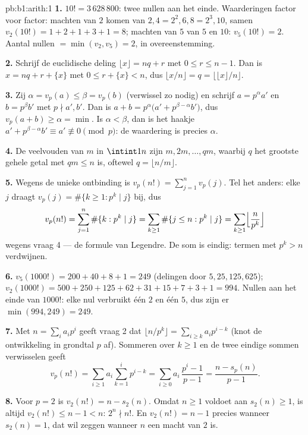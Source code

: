 \begin{solution}{pb:b1:arith:1}
\textbf{1.} $10! = 3\,628\,800$: twee nullen aan het einde. Waarderingen
factor voor factor: machten van $2$ komen van $2, 4 = 2^2, 6, 8 = 2^3,
10$, samen $v_2(10!) = 1 + 2 + 1 + 3 + 1 = 8$; machten van $5$ van $5$ en
$10$: $v_5(10!) = 2$. Aantal nullen $= \min(v_2, v_5) = 2$, in
overeenstemming.

\textbf{2.} Schrijf de euclidische deling $\lfloor x\rfloor = nq + r$ met
$0 \leq r \leq n - 1$. Dan is $x = nq + r + \{x\}$ met $0 \leq r + \{x\}
< n$, dus $\lfloor x/n \rfloor = q = \bigl\lfloor \lfloor x \rfloor / n
\bigr\rfloor$.

\textbf{3.} Zij $\alpha = v_p(a) \leq \beta = v_p(b)$ (verwissel zo
nodig) en schrijf $a = p^\alpha a'$ en $b = p^\beta b'$ met $p \nmid a',
b'$. Dan is $a + b = p^\alpha\bigl(a' + p^{\beta - \alpha}b'\bigr)$, dus
$v_p(a + b) \geq \alpha = \min$. Is $\alpha < \beta$, dan is het haakje
$a' + p^{\beta-\alpha}b' \equiv a' \not\equiv 0 \pmod p$: de waardering is
precies $\alpha$.

\textbf{4.} De veelvouden van $m$ in $\intint1n$ zijn $m, 2m, \dots, qm$,
waarbij $q$ het grootste gehele getal met $qm \leq n$ is, oftewel $q =
\lfloor n/m \rfloor$.

\textbf{5.} Wegens de unieke ontbinding is $v_p(n!) = \sum_{j=1}^{n}
v_p(j)$. Tel het anders: elke $j$ draagt $v_p(j) = \#\{k \geq 1 : p^k
\mid j\}$ bij, dus
\[
v_p(n!) = \sum_{j=1}^n \#\{k : p^k \mid j\}
= \sum_{k\geq1} \#\{j \leq n : p^k \mid j\}
= \sum_{k\geq1} \Bigl\lfloor \frac n{p^k} \Bigr\rfloor
\]
wegens vraag 4 --- de formule van Legendre. De som is eindig: termen met
$p^k > n$ verdwijnen.

\textbf{6.} $v_5(1000!) = 200 + 40 + 8 + 1 = 249$ (delingen door $5, 25,
125, 625$); $v_2(1000!) = 500 + 250 + 125 + 62 + 31 + 15 + 7 + 3 + 1 =
994$. Nullen aan het einde van $1000!$: elke nul verbruikt één $2$ en één
$5$, dus zijn er $\min(994, 249) = 249$.

\textbf{7.} Met $n = \sum_i a_ip^i$ geeft vraag 2 dat $\lfloor n/p^k
\rfloor = \sum_{i \geq k} a_ip^{i-k}$ (knot de ontwikkeling in grondtal
$p$ af). Sommeren over $k \geq 1$ en de twee eindige sommen verwisselen
geeft
\[
v_p(n!) = \sum_{i\geq1} a_i \sum_{k=1}^{i} p^{i-k}
= \sum_{i\geq0} a_i\,\frac{p^i - 1}{p - 1}
= \frac{n - s_p(n)}{p - 1} .
\]

\textbf{8.} Voor $p = 2$ is $v_2(n!) = n - s_2(n)$. Omdat $n \geq 1$
voldoet aan $s_2(n) \geq 1$, is altijd $v_2(n!) \leq n - 1 < n$: $2^n
\nmid n!$. En $v_2(n!) = n - 1$ precies wanneer $s_2(n) = 1$, dat wil
zeggen wanneer $n$ een macht van $2$ is.


\end{solution}
